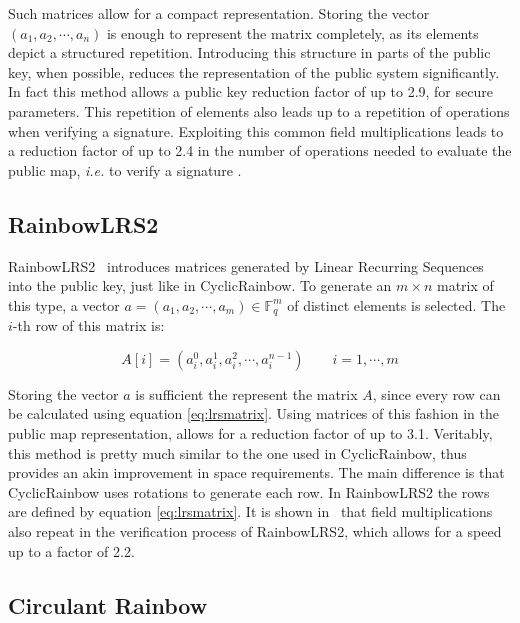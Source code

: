 \documentclass{ufsctex/ufsctex}
\begin{document}
Such matrices allow for a compact representation. Storing the vector $(a_1,
a_2, \cdots, a_n)$ is enough to represent the matrix completely, as its
elements depict a structured repetition. Introducing this structure in parts of
the public key, when possible, reduces the representation of the public system
significantly. In fact this method allows a public key reduction factor of up
to 2.9, for secure parameters. This repetition of elements also leads up to a
repetition of operations when verifying a signature. Exploiting this common
field multiplications leads to a reduction factor of up to 2.4 in the number of
operations needed to evaluate the public map, \textit{i.e.} to verify a
signature \cite{petzoldt2013thesis}.

\subsection{RainbowLRS2}

RainbowLRS2~\cite{petzoldt2013thesis} introduces matrices generated by Linear
Recurring Sequences into the public key, just like in CyclicRainbow. To
generate an $m \times n$ matrix of this type, a vector $a = (a_1, a_2, \cdots,
a_m) \in \mathbb{F}_q^m$ of distinct elements is selected. The $i$-th row of
this matrix is:

\begin{equation}\label{eq:lrsmatrix}
A[i] = (a_i^0, a_i^1, a_i^2, \cdots, a_i^{n-1}) \qquad i = 1, \cdots, m
\end{equation}

Storing the vector $a$ is sufficient the represent the matrix $A$, since every
row can be calculated using equation \ref{eq:lrsmatrix}. Using matrices of this
fashion in the public map representation, allows for a reduction factor of up
to 3.1. Veritably, this method is pretty much similar to the one used in
CyclicRainbow, thus provides an akin improvement in space requirements. The
main difference is that CyclicRainbow uses rotations to generate each row. In
RainbowLRS2 the rows are defined by equation \ref{eq:lrsmatrix}. It is shown
in~\cite{petzoldt2013thesis} that field multiplications also repeat in the
verification process of RainbowLRS2, which allows for a speed up to a factor of
2.2.



\subsection{Circulant Rainbow}
\end{document}
